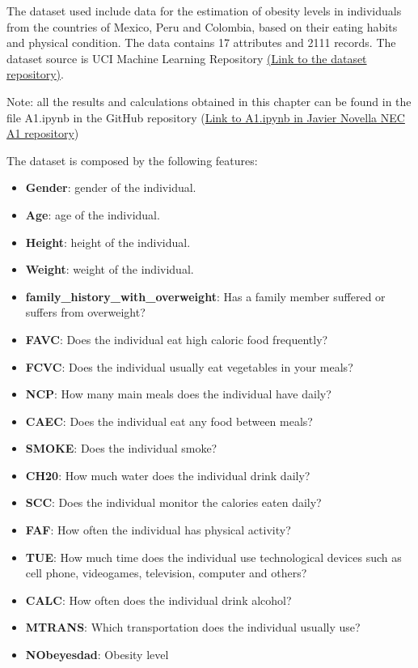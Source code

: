 \documentclass[11pt, a4paper]{article}
\begin{document}
The dataset used include data for the estimation of obesity levels in individuals from the countries of Mexico, Peru and Colombia, based 
on their eating habits and physical condition. The data contains 17 attributes and 2111 records. The dataset source is UCI Machine Learning 
Repository \href{https://archive.ics.uci.edu/dataset/544/estimation+of+obesity+levels+based+on+eating+habits+and+physical+condition}{(Link to the dataset repository)}.

\vspace{1em} Note: all the results and calculations obtained in this chapter can be found in the file A1.ipynb in the GitHub repository 
(\href{https://github.com/novella93/NEC_A1/blob/main/A1.ipynb}{Link to A1.ipynb in Javier Novella NEC A1 repository})

\vspace{1em} The dataset is composed by the following features:

\begin{itemize}
    \item \textbf{Gender}: gender of the individual.
    \item \textbf{Age}: age of the individual.
    \item \textbf{Height}: height of the individual.
    \item \textbf{Weight}: weight of the individual.
    \item \textbf{family\_history\_with\_overweight}: Has a family member suffered or suffers from overweight?
    \item \textbf{FAVC}: Does the individual eat high caloric food frequently?
    \item \textbf{FCVC}: Does the individual usually eat vegetables in your meals?
    \item \textbf{NCP}: How many main meals does the individual have daily?
    \item \textbf{CAEC}: Does the individual eat any food between meals?
    \item \textbf{SMOKE}: Does the individual smoke?
    \item \textbf{CH20}: How much water does the individual drink daily?
    \item \textbf{SCC}: Does the individual monitor the calories eaten daily?
    \item \textbf{FAF}: How often the individual has physical activity?
    \item \textbf{TUE}: How much time does the individual use technological devices such as cell phone, videogames, television, computer and others?
    \item \textbf{CALC}: How often does the individual drink alcohol?
    \item \textbf{MTRANS}: Which transportation does the individual usually use?
    \item \textbf{NObeyesdad}: Obesity level
\end{itemize}
\end{document}
